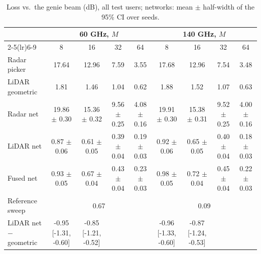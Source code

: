 \begin{table}[t]\centering\caption{Loss vs.\ the genie beam (dB), all test users; networks: mean $\pm$ half-width of the 95\% CI over seeds.}\label{tab:main}
\small\begin{tabular}{@{}lcccccccc@{}}\toprule
 & \multicolumn{4}{c}{60 GHz, $M$} & \multicolumn{4}{c}{140 GHz, $M$} \\
\cmidrule(lr){2-5}\cmidrule(lr){6-9}
 & 8 & 16 & 32 & 64 & 8 & 16 & 32 & 64 \\\midrule
Radar picker & 17.64 & 12.96 & 7.59 & 3.55 & 17.68 & 12.96 & 7.54 & 3.48 \\
LiDAR geometric & 1.81 & 1.46 & 1.04 & 0.62 & 1.88 & 1.52 & 1.07 & 0.63 \\
Radar net & 19.86 $\pm$ 0.30 & 15.36 $\pm$ 0.32 & 9.56 $\pm$ 0.25 & 4.08 $\pm$ 0.16 & 19.91 $\pm$ 0.30 & 15.38 $\pm$ 0.31 & 9.52 $\pm$ 0.25 & 4.00 $\pm$ 0.16 \\
LiDAR net & 0.87 $\pm$ 0.06 & 0.61 $\pm$ 0.05 & 0.39 $\pm$ 0.04 & 0.19 $\pm$ 0.03 & 0.92 $\pm$ 0.06 & 0.65 $\pm$ 0.05 & 0.40 $\pm$ 0.04 & 0.18 $\pm$ 0.03 \\
Fused net & 0.93 $\pm$ 0.05 & 0.67 $\pm$ 0.04 & 0.43 $\pm$ 0.04 & 0.23 $\pm$ 0.03 & 0.98 $\pm$ 0.05 & 0.72 $\pm$ 0.04 & 0.45 $\pm$ 0.04 & 0.22 $\pm$ 0.03 \\
\midrule Reference sweep & \multicolumn{4}{c}{0.67} & \multicolumn{4}{c}{0.09} \\
LiDAR net $-$ geometric & -0.95 [-1.31, -0.60] & -0.85 [-1.21, -0.52] &  &  & -0.96 [-1.33, -0.60] & -0.87 [-1.24, -0.53] &  &  \\
\bottomrule\end{tabular}\end{table}
